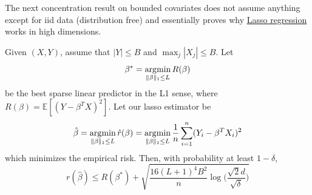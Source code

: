   The next concentration result on bounded covariates does not assume anything except for iid data (distribution free) and essentially proves why \hyperref[def:lasso-regression]{Lasso regression} works in high dimensions. 

  \begin{theorem}
    \label{thm:concentration-of-lasso}
    Given $(X, Y)$, assume that $|Y| \leq B$ and $\max_j |X_j| \leq B$. Let 
    \begin{equation}
      \beta^\ast = \operatorname*{\arg\!\min}_{\|\beta\|_1 \leq L} R(\beta)
    \end{equation}
    be the best sparse linear predictor in the L1 sense, where $R(\beta) = \mathbb{E}[ (Y - \beta^T X)^2]$. Let our lasso estimator be 
    \begin{equation}
      \hat{\beta} = \operatorname*{\arg\!\min}_{\|\beta\|_1 \leq L} \hat{r}(\beta) = \operatorname*{\arg\!\min}_{\|\beta\|_1 \leq L} \frac{1}{n} \sum_{i=1}^n (Y_i - \beta^T X_i)^2
    \end{equation}
    which minimizes the empirical risk. Then, with probability at least $1 - \delta$, 
    \begin{equation}
      r(\hat{\beta}) \leq R(\beta^\ast) + \sqrt{\frac{16(L+1)^4 B^2}{n} \log \bigg( \frac{\sqrt{2} d}{\sqrt{\delta}} \bigg)} 
    \end{equation}
  \end{theorem}
